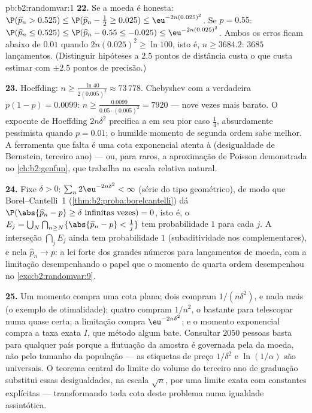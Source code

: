 \begin{solution}{pb:b2:randomvar:1}
\textbf{22.} Se a moeda é honesta: $\P(\widehat p_n > 0.525)
\leq \P(\widehat p_n - \tfrac12 \geq 0.025) \leq
\eu^{-2n(0.025)^2}$. Se $p = 0.55$: $\P(\widehat p_n \leq
0.525) \leq \P(\widehat p_n - 0.55 \leq -0.025) \leq
\eu^{-2n(0.025)^2}$. Ambos os erros ficam abaixo de $0.01$ quando
$2n(0.025)^2 \geq \ln 100$, isto é, $n \geq 3684.2$: $3685$
lançamentos. (Distinguir hipóteses a $2.5$ pontos de distância custa
o que custa estimar com $\pm2.5$ pontos de precisão.)

\textbf{23.} Hoeffding: $n \geq \frac{\ln 40}{2(0.005)^2}
\approx 73\,778$. Chebyshev com a  verdadeira $p(1-p)
= 0.0099$: $n \geq \frac{0.0099}{0.05\cdot(0.005)^2} =
7920$ --- nove vezes mais barato. O expoente de Hoeffding
$2n\delta^2$ precifica a  em seu pior caso $\frac14$,
absurdamente pessimista quando $p = 0.01$; o humilde momento de
segunda ordem sabe melhor. A ferramenta que falta é uma cota
exponencial atenta à  (desigualdade de Bernstein, terceiro ano) --- ou,
para  raros, a aproximação de Poisson demonstrada no
\cref{ch:b2:genfun}, que trabalha na escala relativa natural.

\textbf{24.} Fixe $\delta > 0$: $\sum_n 2\eu^{-2n\delta^2} <
\infty$ (série do tipo geométrico), de modo que Borel--Cantelli~1
(\cref{thm:b2:proba:borelcantelli}) dá
$\P(\abs{\widehat p_n - p} \geq \delta \text{ infinitas
vezes}) = 0$, isto é, o  $E_j =
\bigcup_N\bigcap_{n\geq N}\{\abs{\widehat p_n - p} <
\tfrac1j\}$ tem probabilidade $1$ para cada $j$. A interseção
 $\bigcap_jE_j$ ainda tem probabilidade $1$
(subaditividade nos complementares), e nela $\widehat p_n
\to p$: a lei forte dos grandes números para lançamentos de moeda, com a
limitação desempenhando o papel que o momento de quarta ordem desempenhou no
\cref{exo:b2:randomvar:9}.

\textbf{25.} Um momento compra uma cota plana; dois compram
$1/(n\delta^2)$, e nada mais (o exemplo de otimalidade); quatro
compram $1/n^2$, o bastante para telescopar numa  quase certa;
a limitação compra $\eu^{-2n\delta^2}$; e o momento
exponencial  compra a taxa exata $I$, que método algum
bate. Consultar $2050$ pessoas basta para qualquer país porque
a flutuação da amostra é governada pela  da moeda,
não pelo tamanho da população --- as etiquetas de preço $1/\delta^2$ e
$\ln(1/\alpha)$ são universais. O teorema central do limite do volume
do terceiro ano de graduação substitui essas desigualdades, na
escala $\sqrt n$, por uma  limite exata com constantes
explícitas --- transformando toda cota deste problema numa
igualdade assintótica.
\end{solution}
